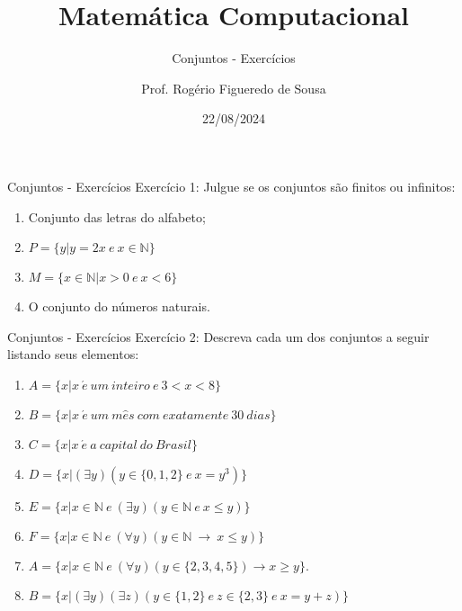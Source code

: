 \documentclass[aspectratio=169]{beamer}
\title{Matemática Computacional}
\subtitle{Conjuntos - Exercícios}
\author{Prof. Rogério Figueredo de Sousa}
\institute{%
\href{rogerio.sousa@ifpi.edu.br}{rogerio.sousa@ifpi.edu.br}%
}%
\date{22/08/2024}
\begin{document}
\begin{frame}[plain]
    \titlepage
\end{frame}




\jsonp
{}

\begin{frame}{Conjuntos - Exercícios}
    Exercício 1: Julgue se os conjuntos são finitos ou infinitos:
    \vspace{4mm}
\begin{enumerate}
    \item Conjunto das letras do alfabeto;
    \item $P = \{y | y = 2x ~ e ~ x \in \mathbb{N} \}$
    \item $M = \{x \in \mathbb{N} | x > 0 ~ e ~ x < 6\}$
    \item O conjunto do números naturais.
\end{enumerate}    
\end{frame}

\begin{frame}{Conjuntos - Exercícios}
    Exercício 2: Descreva cada um dos conjuntos a seguir listando seus elementos:
    \vspace{4mm}
\begin{enumerate}
    \item $A=\{x|x ~ \acute{e} ~ um ~ inteiro ~ e ~ 3 < x < 8\}$
    \item $B=\{x|x ~ \acute{e} ~ um ~ m\hat{e}s ~ com ~ exatamente ~ 30 ~ dias\}$
    \item $C=\{x|x ~ \acute{e} ~ a ~ capital ~ do ~ Brasil\}$
    \item $D=\{x|(\exists y)(y \in \{0,1,2\} ~ e ~ x = y^3)\}$
    \item $E=\{x|x \in \mathbb{N} ~ e ~ (\exists y)(y \in \mathbb{N} ~ e ~ x \leq y)\}$
    \item $F=\{x|x \in \mathbb{N} ~ e ~ (\forall y)(y \in \mathbb{N} ~ \rightarrow ~ x \leq y)\}$
    \item $A = \{x | x \in \mathbb{N} ~ e ~ (\forall y)(y \in \{2, 3, 4, 5\}) \rightarrow x \geq y\}.$
    \item $B = \{x | (\exists y)(\exists z)(y \in \{1,2\} ~ e ~ z \in \{2,3\} ~ e ~ x=y+z)\}$
\end{enumerate}    
\end{frame}
\end{document}
